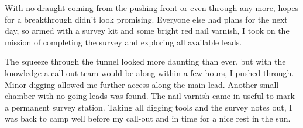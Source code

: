 With no draught coming from the pushing front or even through  any more, hopes for a breakthrough didn't look promising.
Everyone else had plans for the next day, so armed with a survey kit and
some bright red nail varnish, I took on the mission of completing the
survey and exploring all available leads.

The squeeze through the tunnel looked more daunting than ever, but with
the knowledge a call-out team would be along within a few hours, I
pushed through. Minor digging allowed me further access along the main
lead. Another small chamber with no going leads was found. The nail
varnish came in useful to mark a permanent survey station. Taking all
digging tools and the survey notes out, I was back to camp well before
my call-out and in time for a nice rest in the sun.



